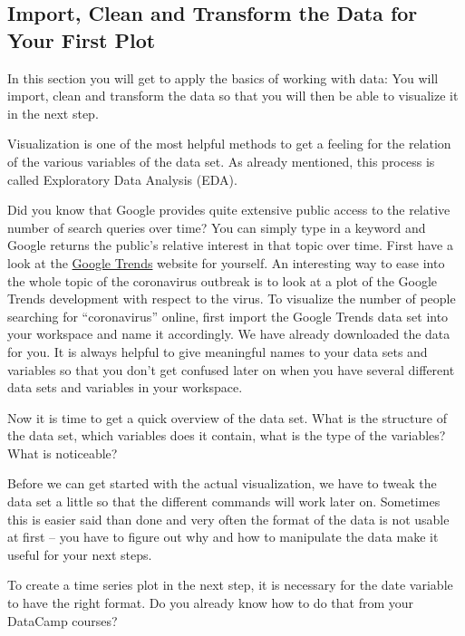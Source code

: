\documentclass[
  11pt,
]{article}
\begin{document}
\hypertarget{import-clean-and-transform-the-data-for-your-first-plot}{%
\subsection{Import, Clean and Transform the Data for Your First Plot}\label{import-clean-and-transform-the-data-for-your-first-plot}}

In this section you will get to apply the basics of working with data: You will import, clean and transform the data so that you will then be able to visualize it in the next step.

Visualization is one of the most helpful methods to get a feeling for the relation of the various variables of the data set. As already mentioned, this process is called Exploratory Data Analysis (EDA).

Did you know that Google provides quite extensive public access to the relative number of search queries over time? You can simply type in a keyword and Google returns the public's relative interest in that topic over time. First have a look at the \href{https://trends.google.de/trends}{Google Trends} website for yourself. An interesting way to ease into the whole topic of the coronavirus outbreak is to look at a plot of the Google Trends development with respect to the virus. To visualize the number of people searching for ``coronavirus'' online, first import the Google Trends data set into your workspace and name it accordingly. We have already downloaded the data for you. It is always helpful to give meaningful names to your data sets and variables so that you don't get confused later on when you have several different data sets and variables in your workspace.

Now it is time to get a quick overview of the data set. What is the structure of the data set, which variables does it contain, what is the type of the variables? What is noticeable?

Before we can get started with the actual visualization, we have to tweak the data set a little so that the different commands will work later on. Sometimes this is easier said than done and very often the format of the data is not usable at first -- you have to figure out why and how to manipulate the data make it useful for your next steps.

To create a time series plot in the next step, it is necessary for the date variable to have the right format. Do you already know how to do that from your DataCamp courses?
\end{document}
